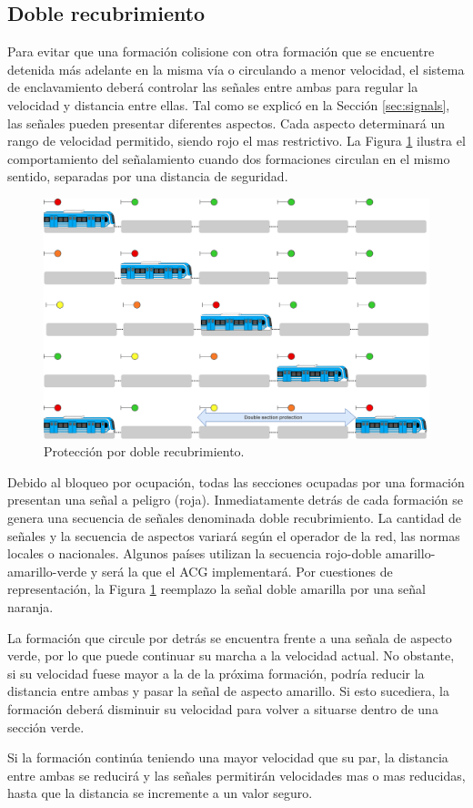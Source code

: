\subsection{Doble recubrimiento}

	\label{sec:function_5}
	
	Para evitar que una formación colisione con otra formación que se encuentre detenida más adelante en la misma vía o circulando a menor velocidad, el sistema de enclavamiento deberá controlar las señales entre ambas para regular la velocidad y distancia entre ellas. Tal como se explicó en la Sección \ref{sec:signals}, las señales pueden presentar diferentes aspectos. Cada aspecto determinará un rango de velocidad permitido, siendo rojo el mas restrictivo. La Figura \ref{fig:ACG_recrubrimiento_1} ilustra el comportamiento del señalamiento cuando dos formaciones circulan en el mismo sentido, separadas por una distancia de seguridad.
	
	\begin{figure}[!h]
		\centering
		\includegraphics[width=1\textwidth]{Figuras/recubrimiento}
		\centering\caption{Protección por doble recubrimiento.}
		\label{fig:ACG_recrubrimiento_1}
	\end{figure}
	
	Debido al bloqueo por ocupación, todas las secciones ocupadas por una formación presentan una señal a peligro (roja). Inmediatamente detrás de cada formación se genera una secuencia de señales denominada doble recubrimiento. La cantidad de señales y la secuencia de aspectos variará según el operador de la red, las normas locales o nacionales. Algunos países utilizan la secuencia rojo-doble amarillo-amarillo-verde y será la que el ACG implementará. Por cuestiones de representación, la Figura \ref{fig:ACG_recrubrimiento_1} reemplazo la señal doble amarilla por una señal naranja.
	
	La formación que circule por detrás se encuentra frente a una señala de aspecto verde, por lo que puede continuar su marcha a la velocidad actual. No obstante, si su velocidad fuese mayor a la de la próxima formación, podría reducir la distancia entre ambas y pasar la señal de aspecto amarillo. Si esto sucediera, la formación deberá disminuir su velocidad para volver a situarse dentro de una sección verde. 
	
	Si la formación continúa teniendo una mayor velocidad que su par, la distancia entre ambas se reducirá y las señales permitirán velocidades mas o mas reducidas, hasta que la distancia se incremente a un valor seguro.